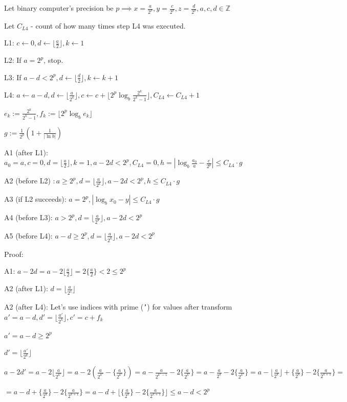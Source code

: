 \documentclass{article}
\begin{document}
Let binary computer's precision be \( p \implies x = \frac{a}{2^p}, y = \frac{c}{2^p}, z = \frac{d}{2^p}, a,c,d \in \mathbb{Z} \)

Let \( C_{L4} \) - count of how many times step L4 was executed.

L1: \( c \leftarrow 0, d \leftarrow \lfloor \frac{a}{2} \rfloor, k \leftarrow 1 \)

L2: If \( a = 2^p \), stop.

L3: If \( a - d < 2^p, d \leftarrow \lfloor\frac{d}{2}\rfloor, k \leftarrow k + 1 \)

L4: \( a \leftarrow a - d, d \leftarrow \lfloor\frac{a}{2^k}\rfloor, c \leftarrow c + \lfloor2^p\log_b\frac{2^k}{2^k-1}\rfloor, C_{L4} \leftarrow C_{L4} + 1 \)

\( e_k := \frac{2^{k}}{2^{k}-1}, f_k := \lfloor2^p\log_be_k\rfloor \)

\( g := \frac{1}{2^p}(1 + \frac{1}{|\ln b|}) \)

A1 (after L1): \( a_0 = a, c = 0, d = \lfloor\frac{a}{2}\rfloor, k = 1, a - 2d < 2^p, C_{L4} = 0, h = |\log_b\frac{a_0}{a}-\frac{c}{2^p}| \leq C_{L4} \cdot g \)

A2 (before L2) \( : a \geq 2^p, d = \lfloor\frac{a}{2^k}\rfloor, a - 2d < 2^p, h \leq C_{L4} \cdot g \)

A3 (if L2 succeeds): \( a = 2^p, |\log_b{x_0} - y| \leq C_{L4} \cdot g \)

A4 (before L3): \( a > 2^p, d = \lfloor\frac{a}{2^k}\rfloor, a - 2d < 2^p \)

A5 (before L4): \( a - d \geq 2^p, d = \lfloor\frac{a}{2^k}\rfloor, a - 2d < 2^p \)

Proof:

A1: \( a-2d=a-2\lfloor\frac{a}{2}\rfloor = 2 \{\frac{a}{2}\} < 2 \leq 2^p \)

A2 (after L1): \( d = \lfloor\frac{a}{2^1}\rfloor \)

A2 (after L4): Let's use indices with prime (\texttt{'}) for values after transform \( a'=a-d, d'=\lfloor\frac{a'}{2^k}\rfloor, c'=c + f_k \)

\( a'=a-d \geq 2^p \)

\( d'=\lfloor\frac{a'}{2^k}\rfloor \)

\( a-2d'=a-2\lfloor\frac{a}{2^{k'}}\rfloor = a-2(\frac{a}{2^{k'}} - \{\frac{a}{2^{k'}}\}) = a-\frac{a}{2^{k'-1}} - 2\{\frac{a}{2^{k'}}\} = a-\frac{a}{2^k} - 2\{\frac{a}{2^{k'}}\} = a - \lfloor\frac{a}{2^k}\rfloor + \{\frac{a}{2^k}\} - 2\{\frac{a}{2^{k+1}}\} = \)

\( = a - d + \{\frac{a}{2^k}\} - 2\{\frac{a}{2^{k+1}}\} = a - d + \lfloor\{\frac{a}{2^k}\} - 2\{\frac{a}{2^{k+1}}\}\rfloor \leq a - d < 2^p \)
\end{document}
